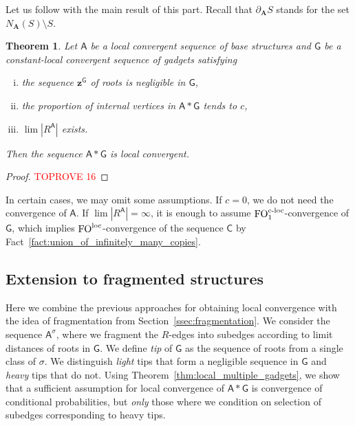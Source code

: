 \documentclass[11pt]{article}
\theoremstyle{plain}
\newtheorem{theorem}{Theorem}[section]
\theoremstyle{definition}
\theoremstyle{remark}
\DeclareMathOperator\FO{FO}
\newcommand{\FOloc}[1]{\FO_{#1}^\textnormal{loc}}
\newcommand{\FOcloc}[1]{\FO_{#1}^{\textnormal{c-loc}}}
\newcommand{\str}[1]{\mathbf{#1}}
\newcommand{\strseq}[1]{{\boldsymbol{\mathsf{#1}}}}
\newcommand{\tpl}[1]{{\bm{#1}}}
\begin{document}
Let us follow with the main result of this part.
Recall that $\partial_\str{A} S$ stands for the set $N_\str{A}(S) \setminus S$.

\begin{theorem}\label{thm:fo_small_roots}
    Let $\strseq{A}$ be a local convergent sequence of base structures and $\strseq{G}$ be a constant-local convergent sequence of gadgets satisfying
    \begin{enumerate}[(i)]
        \item the sequence $\tpl{z}^\strseq{G}$ of roots is negligible in $\strseq{G}$,
        \item the proportion of internal vertices in $\strseq{A}*\strseq{G}$ tends to $c$,
        \item $\lim |R^\strseq{A}|$ exists.
    \end{enumerate}
    Then the sequence $\strseq{A}*\strseq{G}$ is local convergent.
\end{theorem}
\begin{proof}\textcolor{red}{TOPROVE 16}\end{proof}

In certain cases, we may omit some assumptions.
If $c = 0$, we do not need the convergence of $\strseq{A}$.
If $\lim |R^\strseq{A}| = \infty$, it is enough to assume $\FOcloc{1}$-convergence of $\strseq{G}$, which implies $\FOloc{}$-convergence of the sequence $\strseq{C}$ by Fact~\ref{fact:union_of_infinitely_many_copies}.

\subsection{Extension to fragmented structures}\label{ssec:extension_to_fragmented_structures}

Here we combine the previous approaches for obtaining local convergence with the idea of fragmentation from Section~\ref{ssec:fragmentation}.
We consider the sequence $\strseq{A}^\sigma$, where we fragment the $R$-edges into subedges according to limit distances of roots in $\strseq{G}$.
We define \emph{tip} of $\strseq{G}$ as the sequence of roots from a single class of $\sigma$.
We distinguish \emph{light} tips that form a negligible sequence in $\strseq{G}$ and \emph{heavy} tips that do not.
Using Theorem~\ref{thm:local_multiple_gadgets}, we show that a sufficient assumption for local convergence of $\strseq{A}*\strseq{G}$ is convergence of conditional probabilities, but \emph{only} those where we condition on selection of subedges corresponding to heavy tips.
\end{document}
